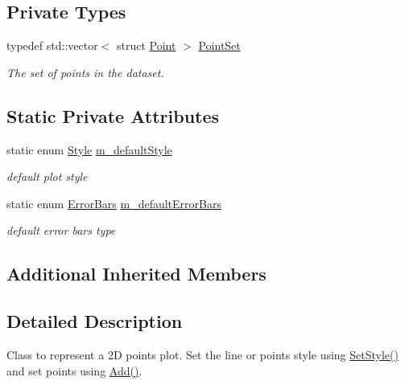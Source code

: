 \subsection*{Private Types}
\begin{DoxyCompactItemize}
\item 
typedef std\+::vector$<$ struct \hyperlink{structns3_1_1Gnuplot2dDataset_1_1Point}{Point} $>$ \hyperlink{classns3_1_1Gnuplot2dDataset_a0bfbcfd6b610e459b2ad97425c8724ae}{Point\+Set}
\begin{DoxyCompactList}\small\item\em The set of points in the dataset. \end{DoxyCompactList}\end{DoxyCompactItemize}
\subsection*{Static Private Attributes}
\begin{DoxyCompactItemize}
\item 
static enum \hyperlink{classns3_1_1Gnuplot2dDataset_abdad90b4b2abed9a198e4b19470de882}{Style} \hyperlink{classns3_1_1Gnuplot2dDataset_a5c4951f790ca41a3b0ed6807997456fc}{m\+\_\+default\+Style}
\begin{DoxyCompactList}\small\item\em default plot style \end{DoxyCompactList}\item 
static enum \hyperlink{classns3_1_1Gnuplot2dDataset_a5984738d258811bed5eff163d4e3d648}{Error\+Bars} \hyperlink{classns3_1_1Gnuplot2dDataset_aea3f3688ff281aeba6860a62416f4e83}{m\+\_\+default\+Error\+Bars}
\begin{DoxyCompactList}\small\item\em default error bars type \end{DoxyCompactList}\end{DoxyCompactItemize}
\subsection*{Additional Inherited Members}


\subsection{Detailed Description}
Class to represent a 2D points plot. Set the line or points style using \hyperlink{classns3_1_1Gnuplot2dDataset_a7a3d6b6c2bd7d32a82f5715bae37c886}{Set\+Style()} and set points using \hyperlink{classns3_1_1Gnuplot2dDataset_abd93f7c8fa2d1ed643c09d7fb8d5ef27}{Add()}. 

